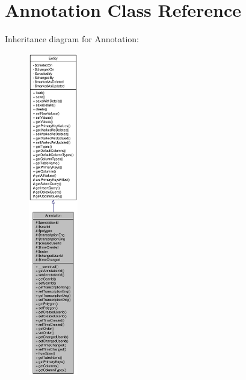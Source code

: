\hypertarget{classAnnotation}{
\section{Annotation Class Reference}
\label{classAnnotation}
}


Inheritance diagram for Annotation:\nopagebreak
\begin{figure}[H]
\begin{center}
\leavevmode
\includegraphics[height=400pt]{classAnnotation__inherit__graph}
\end{center}
\end{figure}


